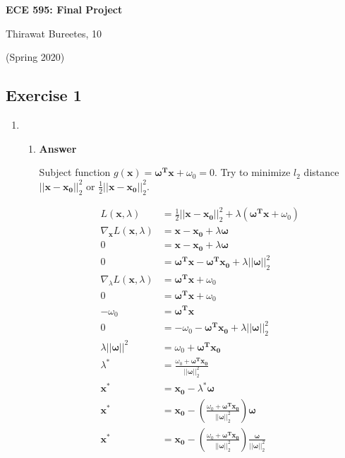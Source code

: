 \documentclass[11pt]{article}
\begin{document}
\begin{center}
\Large{\textbf{ECE 595: Final Project}}

Thirawat Bureetes, 10

(Spring 2020)
\end{center}


\subsection*{Exercise 1}

\begin{enumerate}[label=(\alph*)]


\item 

\begin{enumerate}[label=(\roman*)]

\item \noindent\textbf{Answer}

Subject function $g(\mathbf{x}) = \boldsymbol{\omega^T}\mathbf{x} + \omega_0 = 0$. Try to minimize $l_2$ distance $||\mathbf{x}-\mathbf{x_0}||_2^2$ or $\frac{1}{2}||\mathbf{x}-\mathbf{x_0}||_2^2$.

\begin{align*}
L(\mathbf{x}, \lambda) &= \frac{1}{2}||\mathbf{x}-\mathbf{x_0}||_2^2 + \lambda(\boldsymbol{\omega^T}\mathbf{x} + \omega_0)\\
\nabla_\mathbf{x} L(\mathbf{x}, \lambda) &= \mathbf{x}-\mathbf{x_0} + \lambda\boldsymbol{\omega}\\
0 &= \mathbf{x}-\mathbf{x_0} + \lambda\boldsymbol{\omega} \\
0 &= \boldsymbol{\omega^T}\mathbf{x}-\boldsymbol{\omega^T}\mathbf{x_0} + \lambda||\boldsymbol{\omega}||_2^2 \\
\nabla_\lambda L(\mathbf{x}, \lambda) &= \boldsymbol{\omega^T}\mathbf{x} + \omega_0\\
0 &= \boldsymbol{\omega^T}\mathbf{x} + \omega_0\\
- \omega_0 &= \boldsymbol{\omega^T}\mathbf{x}\\
0 &= - \omega_0-\boldsymbol{\omega^T}\mathbf{x_0} + \lambda||\boldsymbol{\omega}||_2^2 \\
\lambda||\boldsymbol{\omega}||^2 &=  \omega_0 + \boldsymbol{\omega^T}\mathbf{x_0} \\
\lambda^* &=  \frac{\omega_0 + \boldsymbol{\omega^T}\mathbf{x_0}}{||\boldsymbol{\omega}||_2^2} \\
\mathbf{x^*} &= \mathbf{x_0} - \lambda^* \boldsymbol{\omega} \\
\mathbf{x^*} &= \mathbf{x_0} - (\frac{\omega_0 + \boldsymbol{\omega^T}\mathbf{x_0}}{||\boldsymbol{\omega}||_2^2}) \boldsymbol{\omega} \\
\mathbf{x^*} &= \mathbf{x_0} - (\frac{\omega_0 + \boldsymbol{\omega^T}\mathbf{x_0}}{||\boldsymbol{\omega}||_2^2})\frac{ \boldsymbol{\omega}}{||\boldsymbol{\omega}||_2^2} \\
\end{align*}


\end{enumerate}
\end{enumerate}
\end{document}
